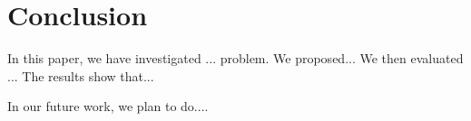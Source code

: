 
\section{Conclusion}
\label{sec:conclusion}

In this paper, we have investigated  ... problem. We proposed... We then evaluated ... The results show that...


In our future work, we plan to do....


